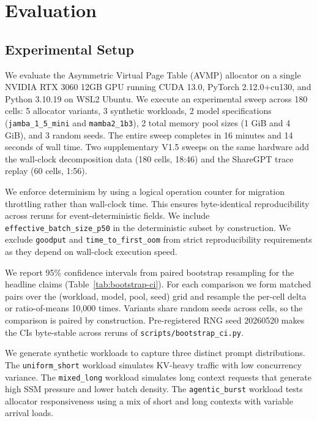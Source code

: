 \section{Evaluation}
\label{sec:eval}

\subsection{Experimental Setup}
\label{sec:eval:setup}

We evaluate the Asymmetric Virtual Page Table (AVMP) allocator on a single NVIDIA RTX 3060 12GB GPU running CUDA 13.0, PyTorch 2.12.0+cu130, and Python 3.10.19 on WSL2 Ubuntu. We execute an experimental sweep across 180 cells: 5 allocator variants, 3 synthetic workloads, 2 model specifications (\texttt{jamba\_1\_5\_mini} and \texttt{mamba2\_1b3}), 2 total memory pool sizes (1 GiB and 4 GiB), and 3 random seeds. The entire sweep completes in 16 minutes and 14 seconds of wall time. Two supplementary V1.5 sweeps on the same hardware add the wall-clock decomposition data (180 cells, 18:46) and the ShareGPT trace replay (60 cells, 1:56).

We enforce determinism by using a logical operation counter for migration throttling rather than wall-clock time. This ensures byte-identical reproducibility across reruns for event-deterministic fields. We include \texttt{effective\_batch\_size\_p50} in the deterministic subset by construction. We exclude \texttt{goodput} and \texttt{time\_to\_first\_oom} from strict reproducibility requirements as they depend on wall-clock execution speed.

We report 95\% confidence intervals from paired bootstrap resampling for the headline claims (Table~\ref{tab:bootstrap-ci}). For each comparison we form matched pairs over the (workload, model, pool, seed) grid and resample the per-cell delta or ratio-of-means 10{,}000 times. Variants share random seeds across cells, so the comparison is paired by construction. Pre-registered RNG seed 20260520 makes the CIs byte-stable across reruns of \texttt{scripts/bootstrap\_ci.py}.

We generate synthetic workloads to capture three distinct prompt distributions. The \texttt{uniform\_short} workload simulates KV-heavy traffic with low concurrency variance. The \texttt{mixed\_long} workload simulates long context requests that generate high SSM pressure and lower batch density. The \texttt{agentic\_burst} workload tests allocator responsiveness using a mix of short and long contexts with variable arrival loads.

